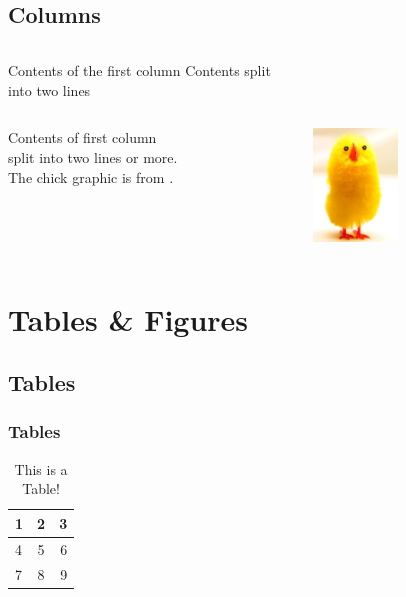 \documentclass{beamer}
\begin{document}
		\subsection{Columns}
			\begin{frame}
		    \begin{columns}[c] %
		     Contents of the first column
		     Contents split \\ into two lines
		    \end{columns}
		\end{frame}
		 
		\begin{frame}
		     \begin{columns}[t] %
		     \begin{column}[T]{5cm} %
		     Contents of first column \\ split into two lines or more. \\ The chick graphic is from \cite{Chick}. 
		     \end{column}
		     \begin{column}[T]{5cm} %
		          \includegraphics[height=3cm]{Chick1.png}
		     \end{column}
		     \end{columns}
		\end{frame}
		
	\section{Tables \& Figures}
		\subsection{Tables}
		\begin{frame}
			\frametitle{Tables}
				 \begin{table}
				 	\begin{tabular}{ l | c || r | }
					    \hline
					    1 & 2 & 3 \\ \hline
					    4 & 5 & 6 \\ \hline
					    7 & 8 & 9 \\
					    \hline
					  \end{tabular}
				\caption{This is a Table!} 
				 \end{table}
		\end{frame}
\end{document}
